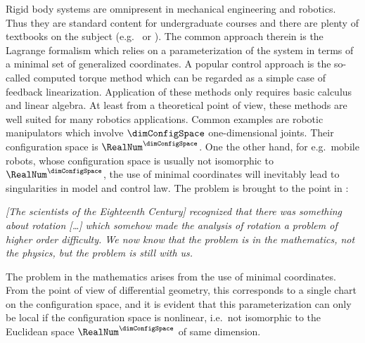 Rigid body systems are omnipresent in mechanical engineering and robotics.
Thus they are standard content for undergraduate courses and there are plenty of textbooks on the subject (e.g.\ \cite{Goldstein:ClassicalMechanics} or \cite{Spong:RobotModelingAndControl}).
The common approach therein is the Lagrange formalism which relies on a parameterization of the system in terms of a minimal set of generalized coordinates.
A popular control approach is the so-called computed torque method which can be regarded as a simple case of feedback linearization.
Application of these methods only requires basic calculus and linear algebra.
At least from a theoretical point of view, these methods are well suited for many robotics applications.
Common examples are robotic manipulators which involve $\dimConfigSpace$ one-dimensional joints.
Their configuration space is $\RealNum^{\dimConfigSpace}$.
One the other hand, for e.g.\ mobile robots, whose configuration space is usually not isomorphic to $\RealNum^{\dimConfigSpace}$, the use of minimal coordinates will inevitably lead to singularities in model and control law.
The problem is brought to the point in \cite[sec.\ 1.1.1]{Schwertassek:MultibodySystems}:
\begin{center}
\it
[The scientists of the Eighteenth Century] recognized that there was something about rotation [\ldots] which somehow made the analysis of rotation a problem of higher order difficulty. 
We now know that the problem is in the mathematics, not the physics, but the problem is still with us.
\end{center}
The problem in the mathematics arises from the use of minimal coordinates.
From the point of view of differential geometry, this corresponds to a single chart on the configuration space, and it is evident that this parameterization can only be local if the configuration space is nonlinear, i.e.\ not isomorphic to the Euclidean space $\RealNum^{\dimConfigSpace}$ of same dimension.

